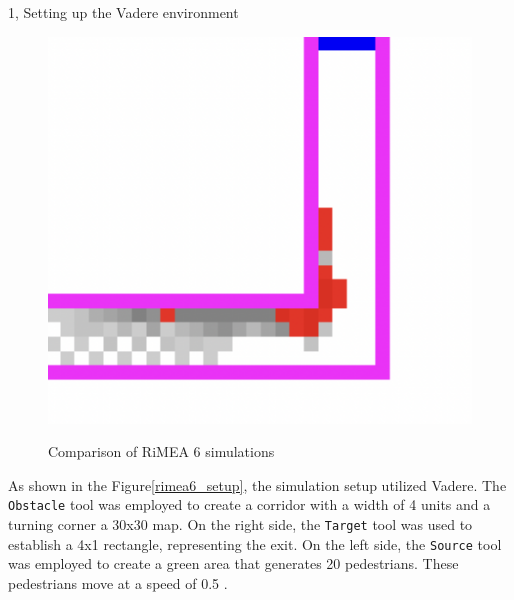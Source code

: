 \begin{task}{1, Setting up the Vadere environment}
\begin{figure}[H]
{\includegraphics[scale=0.25]{report-template/images/old-rimea-6-run.png}}
\caption{Comparison of RiMEA 6 simulations}
\label{rimea6}
\end{figure}


As shown in the Figure\ref{rimea6_setup}, the simulation setup utilized Vadere. The \texttt{Obstacle} tool was employed to create a corridor with a width of 4 units and a turning corner a 30x30 map. On the right side, the \texttt{Target} tool was used to establish a 4x1 rectangle, representing the exit. On the left side, the \texttt{Source} tool was employed to create a green area that generates 20 pedestrians. These pedestrians move at a speed of 0.5 .


\end{task}
